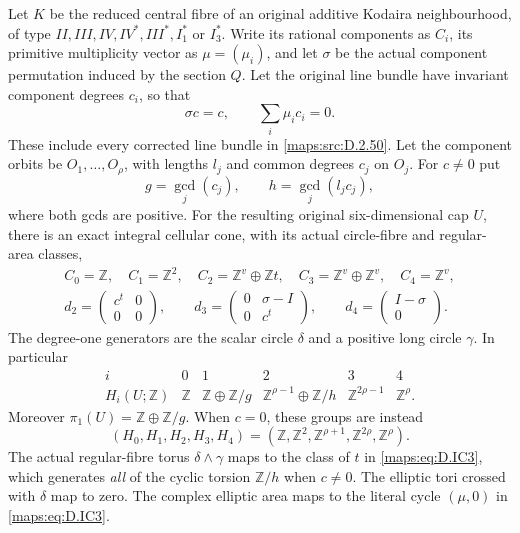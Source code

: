 \begin{theorem}
Let $K$ be the reduced central fibre of an original additive
Kodaira neighbourhood, of type
$II,III,IV,IV^*,III^*,I_1^*$ or $I_3^*$.
Write its rational components as $C_i$, its primitive
multiplicity vector as $\mu=(\mu_i)$, and let $\sigma$
be the actual component permutation induced by the section $Q$.
Let the original line bundle have invariant component degrees
$c_i$, so that
\[
                  \sigma c=c,\qquad \sum_i\mu_i c_i=0.
                                                        \tag{D.IC1}\label{maps:eq:D.IC1}
\]
These include every corrected line bundle in \ref{maps:src:D.2.50}.
Let the component orbits be $O_1,\ldots,O_\rho$, with
lengths $l_j$ and common degrees $c_j$ on $O_j$.
For $c\ne0$ put
\[
                  g=\gcd_j(c_j),\qquad
                  h=\gcd_j(l_jc_j),
                                                        \tag{D.IC2}\label{maps:eq:D.IC2}
\]
where both gcds are positive. For the resulting original
six-dimensional cap $U$, there is an exact integral cellular
cone, with its actual circle-fibre and regular-area classes,
\[
\begin{gathered}
 C_0=\mathbb Z,\quad C_1=\mathbb Z^2,\quad
 C_2=\mathbb Z^v\oplus\mathbb Zt,\quad
 C_3=\mathbb Z^v\oplus\mathbb Z^v,\quad C_4=\mathbb Z^v,\\
 d_2=\begin{pmatrix}c^t&0\\0&0\end{pmatrix},\qquad
 d_3=\begin{pmatrix}0&\sigma-I\\0&c^t\end{pmatrix},\qquad
 d_4=\begin{pmatrix}I-\sigma\\0\end{pmatrix}.
\end{gathered}                                             \tag{D.IC3}\label{maps:eq:D.IC3}
\]
The degree-one generators are the scalar circle $\delta$
and a positive long circle $\gamma$. In particular
\[
\begin{array}{c|ccccc}
i&0&1&2&3&4\\\hline
H_i(U;\mathbb Z)&\mathbb Z&
\mathbb Z\oplus\mathbb Z/g&
\mathbb Z^{\rho-1}\oplus\mathbb Z/h&
\mathbb Z^{2\rho-1}&\mathbb Z^\rho .
\end{array}                                               \tag{D.IC4}\label{maps:eq:D.IC4}
\]
Moreover $\pi_1(U)=\mathbb Z\oplus\mathbb Z/g$.
When $c=0$, these groups are instead
\[
 (H_0,H_1,H_2,H_3,H_4)=
 (\mathbb Z,\mathbb Z^2,\mathbb Z^{\rho+1},
                         \mathbb Z^{2\rho},\mathbb Z^\rho).
                                                        \tag{D.IC5}\label{maps:eq:D.IC5}
\]
The actual regular-fibre torus $\delta\wedge\gamma$
maps to the class of $t$ in \eqref{maps:eq:D.IC3}, which generates
\emph{all} of the cyclic torsion $\mathbb Z/h$ when
$c\ne0$. The elliptic tori crossed with $\delta$ map
to zero. The complex elliptic area maps to the literal
cycle $(\mu,0)$ in \eqref{maps:eq:D.IC3}.


\end{theorem}
